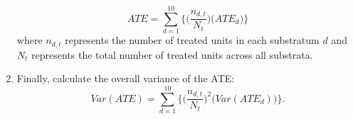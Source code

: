 \documentclass[11pt,titlepage]{article}
\begin{document}
\begin{enumerate}
{\begin{equation}
      ATE=\sum_{d=1}^{10} \Big \{ \big (\frac{n_{d,t}}{N_t} \big ) \big (ATE_d
      \big ) \Big \}
    \end{equation}
    where $n_{d,t}$ represents the number of treated units in each
    substratum $d$ and $N_t$ represents the total number of treated units
    across all substrata.}
\item{Finally, calculate the overall variance of the ATE:
    \begin{equation}
      Var(ATE)=\sum_{d=1}^{10} \Big \{ \big (\frac{n_{d,t}}{N_t} \big )^2 \big (Var(ATE_d)
      \big ) \Big \}.
    \end{equation}}
\end{enumerate}




\clearpage



\end{document}
